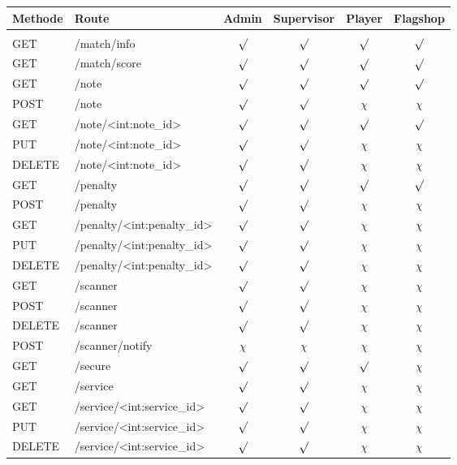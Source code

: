\begin{table}
	\centering
	\begin{tabular}{l l c c c c}
		Methode & Route	& Admin & Supervisor & Player  & Flagshop \\ [0.5ex]
		\hline &&&&&\\
		GET		& /match/info						& $\surd$ & $\surd$ & $\surd$ & $\surd$ \\
		GET		& /match/score						& $\surd$ & $\surd$ & $\surd$ & $\surd$ \\
		GET		& /note								& $\surd$ & $\surd$ & $\surd$ & $\surd$ \\
		POST	& /note								& $\surd$ & $\surd$ & $\chi$ & $\chi$ \\
		GET 	& /note/<int:note\_id>				& $\surd$ & $\surd$ & $\surd$ & $\surd$ \\
		PUT 	& /note/<int:note\_id>				& $\surd$ & $\surd$ & $\chi$ & $\chi$ \\
		DELETE	& /note/<int:note\_id>				& $\surd$ & $\surd$ & $\chi$ & $\chi$ \\
		GET		& /penalty							& $\surd$ & $\surd$ & $\surd$ & $\surd$ \\
		POST	& /penalty							& $\surd$ & $\surd$ & $\chi$ & $\chi$ \\
		GET		& /penalty/<int:penalty\_id>		& $\surd$ & $\surd$ & $\chi$ & $\chi$ \\
		PUT		& /penalty/<int:penalty\_id>		& $\surd$ & $\surd$ & $\chi$ & $\chi$ \\
		DELETE	& /penalty/<int:penalty\_id>		& $\surd$ & $\surd$ & $\chi$ & $\chi$ \\
		GET		& /scanner							& $\surd$ & $\surd$ & $\chi$ & $\chi$ \\
		POST	& /scanner							& $\surd$ & $\surd$ & $\chi$ & $\chi$ \\
		DELETE	& /scanner							& $\surd$ & $\surd$ & $\chi$ & $\chi$ \\
		POST	& /scanner/notify					& $\chi$ & $\chi$ & $\chi$ & $\chi$ \\
		GET 	& /secure							& $\surd$ & $\surd$ & $\surd$ & $\chi$ \\
		GET		& /service							& $\surd$ & $\surd$ & $\chi$ & $\chi$ \\
		GET		& /service/<int:service\_id>		& $\surd$ & $\surd$ & $\chi$ & $\chi$ \\
		PUT		& /service/<int:service\_id>		& $\surd$ & $\surd$ & $\chi$ & $\chi$ \\
		DELETE	& /service/<int:service\_id>		& $\surd$ & $\surd$ & $\chi$ & $\chi$ \\

\end{tabular}
\end{table}
